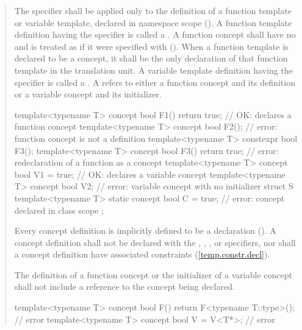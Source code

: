 \begin{quote}
\begin{addedblock}
\pnum
The  specifier shall be applied only to the 
definition of a function template or variable template, declared
in namespace scope ().
%
A function template definition having the 
specifier is called a . 
% 
A function concept shall have no  
and is treated as if it were specified with  
().
%
When a function template is declared to be a concept, it shall be the only
declaration of that function template in the translation unit.
%
A variable template definition having the  
specifier is called a .
%
A  refers to either a function concept 
and its definition or a variable concept and its initializer.
%
\enterexample
\begin{codeblock}
template<typename T> 
  concept bool F1() { return true; } // OK: declares a function concept
template<typename T> 
  concept bool F2();                 // error: function concept is not a definition
template<typename T> 
  constexpr bool F3();
template<typename T>
  concept bool F3() { return true; } // error: redeclaration of a function as a concept
template<typename T> 
  concept bool V1 = true;            // OK: declares a variable concept
template<typename T> 
  concept bool V2;                   // error: variable concept with no initializer
struct S {
  template<typename T> 
    static concept bool C = true;    // error: concept declared in class scope
};
\end{codeblock}
\exitexample

\pnum
Every concept definition is implicitly defined to be a 
 declaration ().
% 
A concept definition shall not be declared with the 
, , , or 
 specifiers, nor shall a concept definition have associated 
constraints (\ref{temp.constr.decl}).

\pnum
The definition of a function concept or the initializer of
a variable concept shall not include a reference to the concept being
declared.
%
\enterexample
\begin{codeblock}
template<typename T>
  concept bool F() { return F<typename T::type>(); } // error
template<typename T>
  concept bool V = V<T*>;                            // error
\end{codeblock}
\exitexample


\end{addedblock}
\end{quote}
